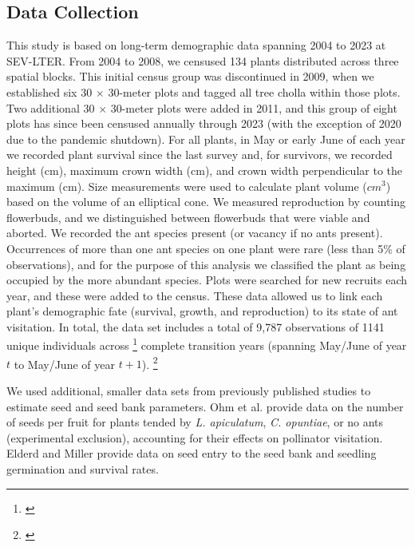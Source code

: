 \documentclass[11pt]{article}
\newcommand{\tom}[2]{{\color{red}{#1}}\footnote{\textit{\color{red}{#2}}}}
\begin{document}
\subsection*{Data Collection}
This study is based on long-term demographic data spanning 2004 to 2023 at SEV-LTER. 
From 2004 to 2008, we censused 134 plants distributed across three spatial blocks. 
This initial census group was discontinued in 2009, when we established six 30 $\times$ 30-meter plots and tagged all tree cholla within those plots. 
Two additional 30 $\times$ 30-meter plots were added in 2011, and this group of eight plots has since been censused annually through 2023 (with the exception of 2020 due to the pandemic shutdown). 
For all plants, in May or early June of each year we recorded plant survival since the last survey and, for survivors, we recorded height (cm), maximum crown width (cm), and crown width perpendicular to the maximum (cm).
Size measurements were used to calculate plant volume ($cm^3$) based on the volume of an elliptical cone. 
We measured reproduction by counting flowerbuds, and we distinguished between flowerbuds that were viable and aborted. 
We recorded the ant species present (or vacancy if no ants present).
Occurrences of more than one ant species on one plant were rare (less than 5\% of observations), and for the purpose of this analysis we classified the plant as being occupied by the more abundant species. 
Plots were searched for new recruits each year, and these were added to the census.
These data allowed us to link each plant's demographic fate (survival, growth, and reproduction) to its state of ant visitation. 
In total, the data set includes a total of 9,787 observations of 1141 unique individuals across \tom{19}{There are actually 16 years (you can see my tally in the 01 script). In your code you took length(unique(Yeart1)). But one of these years is 2024 (for which there is no t1 data entered), one is NA, and 2019-2021 does not count.} complete transition years (spanning May/June of year $t$ to May/June of year $t+1$). 
\tom{}{You should cite the data package here. The published package only goes up to 2018, so we should talk about updating that package with you as lead author, which should be easy to do as long as the data are QAQC'd.}

We used additional, smaller data sets from previously published studies to estimate seed and seed bank parameters. 
Ohm et al. \citeyear{Ohm2014} provide data on the number of seeds per fruit for plants tended by \textit{L. apiculatum}, \textit{C. opuntiae}, or no ants (experimental exclusion), accounting for their effects on pollinator visitation. 
Elderd and Miller \citeyear{elderd2016quantifying} provide data on seed entry to the seed bank and seedling germination and survival rates. 
\end{document}
